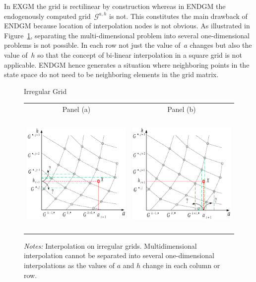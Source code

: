 \documentclass[a4paper,12pt]{article}
\begin{document}
In EXGM the grid is rectilinear by construction whereas in ENDGM the endogenously computed grid~$\mathcal{G}^{a,h}$ is not. This constitutes the main drawback of ENDGM because location of interpolation nodes is not obvious. As illustrated in Figure~\ref{Irregular_Grid}, separating the multi-dimensional problem into several one-dimensional problems is not possible. In each row not just the value of~$a$ changes but also the value of~$h$ so that the concept of bi-linear interpolation in a square grid is not applicable. ENDGM hence generates a situation where neighboring points in the state space do not need to be neighboring elements in the grid matrix. 
\begin{figure}[htbp] 
	\caption{Irregular Grid}
	\label{Irregular_Grid}
	\centering
	\begin{tabular}{cc}
		Panel (a) & Panel (b) \\
		\includegraphics[height=6.0cm, width=7.5cm]{Abbildungen/endo_grid_1.eps} & \includegraphics[height=6.0cm, width=7.5cm]{Abbildungen/endo_grid_2.eps} \\
	\end{tabular}
	\caption*{\footnotesize{\emph{Notes:} Interpolation on irregular grids. Multidimensional interpolation cannot be separated into several one-dimensional interpolations as the values of $a$ and $h$ change in each column or row.}}
\end{figure}
\end{document}
